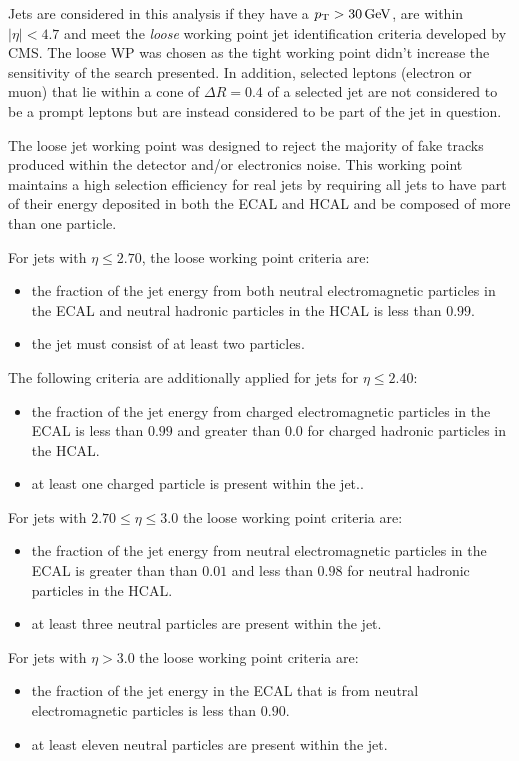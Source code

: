 Jets are considered in this analysis if they have a $p_{\mathrm{T}} > 30\,\text{Ge\hspace{-.08em}V}$, are within $|\eta| < 4.7$ and meet the \emph{loose} working point jet identification criteria developed by CMS.
The loose WP was chosen as the tight working point didn't increase the sensitivity of the search presented.
In addition, selected leptons (electron or muon) that lie within a cone of $\Delta R = 0.4$ of a selected jet are not considered to be a prompt leptons but are instead considered to be part of the jet in question.

The loose jet working point was designed to reject the majority of fake tracks produced within the detector and/or electronics noise. 
This working point maintains a high selection efficiency for real jets by requiring all jets to have part of their energy deposited in both the ECAL and HCAL and be composed of more than one particle.

For jets with $\eta \leq 2.70$, the loose working point criteria are:
\begin{itemize}
\item the fraction of the jet energy from both neutral electromagnetic particles in the ECAL and neutral hadronic particles in the HCAL is less than $0.99$.
\item the jet must consist of at least two particles.
\end{itemize}

The following criteria are additionally applied for jets for $\eta \leq 2.40$:
\begin{itemize}
\item the fraction of the jet energy from charged electromagnetic particles in the ECAL is less than $0.99$ and greater than 0.0 for charged hadronic particles in the HCAL.
\item at least one charged particle is present within the jet..
\end{itemize}

For jets with $ 2.70 \leq \eta \leq 3.0$ the loose working point criteria are:
\begin{itemize}
\item the fraction of the jet energy from neutral electromagnetic particles in the ECAL is greater than than $0.01$ and less than $0.98$ for neutral hadronic particles in the HCAL.
\item at least three neutral particles are present within the jet.
\end{itemize}

For jets with $\eta > 3.0$ the loose working point criteria are:
\begin{itemize}
\item the fraction of the jet energy in the ECAL that is from neutral electromagnetic particles is less than $0.90$.
\item at least eleven neutral particles are present within the jet.
\end{itemize}

